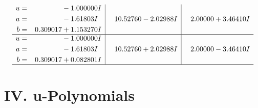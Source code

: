 \documentclass[1p]{elsarticle_modified}
\theoremstyle{definition}
\begin{document}
$$\begin{array}{c|c|c}
\begin{aligned}
u &= \phantom{-0.000000 } -1.000000 I \\
a &= \phantom{-0.000000 } -1.61803 I \\
b &= \phantom{-}0.309017 + 1.153270 I\end{aligned}
 & \phantom{-}10.52760 - 2.02988 I & \phantom{-}2.00000 + 3.46410 I \\ \hline\begin{aligned}
u &= \phantom{-0.000000 } -1.000000 I \\
a &= \phantom{-0.000000 } -1.61803 I \\
b &= \phantom{-}0.309017 + 0.082801 I\end{aligned}
 & \phantom{-}10.52760 + 2.02988 I & \phantom{-}2.00000 - 3.46410 I\\
 \hline 
 \end{array}$$\newpage
\newpage\renewcommand{\arraystretch}{1}
\centering \section*{ IV. u-Polynomials}
\end{document}
